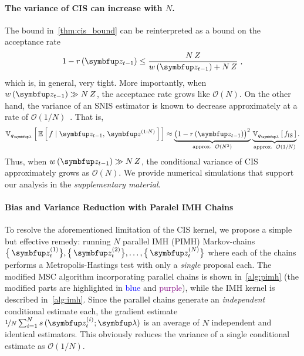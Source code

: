 \paragraph{The variance of CIS can increase with \(N\).}
The bound in~\cref{thm:cis_bound} can be reinterpreted as a bound on the acceptance rate 
\begin{align}
  1 - r\,(\vz_{t-1}) \leq \frac{N\,Z}{ w\,(\vz_{t-1}) + N\,Z}\;,
\end{align}
which is, in general, very tight.
More importantly, when \(w\,(\vz_{t-1}) \gg N\,Z\), the acceptance rate grows like \(\mathcal{O}(N)\).
On the other hand, the variance of an SNIS estimator is known to decrease approximately at a rate of \(\mathcal{O}(1/N)\)~\citep{kong_sequential_1994, robert_monte_2004, elvira_rethinking_2018}.
That is, 
\begin{align}
  \Vsub{q_{\vlambda}}{ \E{ f \mid \vz_{t-1},\,\vz^{(1:N)} } } \approx \underbrace{{\big(1 - r\,(\vz_{t-1})\big)}^2}_{\text{approx.}\;\;\mathcal{O}(N^2)} \,
  \underbrace{\Vsub{q_{\vlambda}}{ f_{\text{IS}} }}_{\text{approx.}\;\;\mathcal{O}(1/N)}.\label{eq:cis_variance_incr}
\end{align}
Thus, when \(w\,(\vz_{t-1})\gg N\,Z\), the conditional variance of CIS approximately grows as \(\mathcal{O}(N)\).
We provide numerical simulations that support our analysis in the \textit{supplementary material}.

\vspace{-0.02in}


\vspace{-0.1in}
\paragraph{Bias and Variance Reduction with Paralel IMH Chains}
To resolve the aforementioned limitation of the CIS kernel, we propose a simple but effective remedy: running \(N\) parallel IMH (PIMH) Markov-chains \( \big\{\,\vz_t^{(1)}\big\}, \big\{\,\vz_t^{(2)}\big\}, \ldots, \big\{\,\vz_t^{(N)}\big\}\) where each of the chains performs a Metropolis-Hastings test with only a \textit{single} proposal each.
The modified MSC algorithm incorporating parallel chains is shown in~\cref{alg:pimh} (the modified parts are highlighted in \textcolor{blue}{blue} and \textcolor{purple}{purple}), while the IMH kernel is described in~\cref{alg:imh}.
Since the parallel chains generate an \textit{independent} conditional estimate each, the gradient estimate \(\nicefrac{1}{N} \sum^{N}_{i=1} s\,(\vz_t^{(i)}; \vlambda)\) is an average of \(N\) independent and identical estimators.
This obviously reduces the variance of a single conditional estimate as \(\mathcal{O}(1/N)\).
%
%

